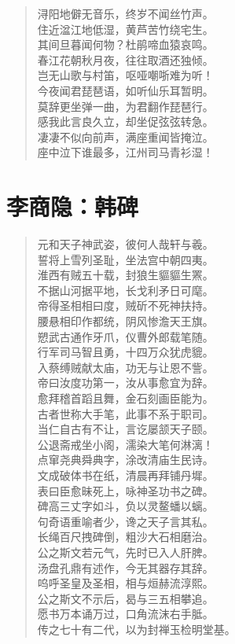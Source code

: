 \documentclass[12pt,oneside]{book}
\newenvironment{shici}{
\begin{verse}
\centering\large\hspace{12pt}}
{\end{verse}}
\begin{document}
\begin{shici}
浔阳地僻无音乐，终岁不闻丝竹声。\\
住近湓江地低湿，黄芦苦竹绕宅生。\\
其间旦暮闻何物？杜鹃啼血猿哀鸣。\\
春江花朝秋月夜，往往取酒还独倾。\\
岂无山歌与村笛，呕哑嘲哳难为听！\\
今夜闻君琵琶语，如听仙乐耳暂明。\\
莫辞更坐弹一曲，为君翻作琵琶行。\\
感我此言良久立，却坐促弦弦转急。\\
凄凄不似向前声，满座重闻皆掩泣。\\
座中泣下谁最多，江州司马青衫湿！
\end{shici}

\chapter{李商隐：韩碑}
\begin{shici}
元和天子神武姿，彼何人哉轩与羲。\\
誓将上雪列圣耻，坐法宫中朝四夷。\\
淮西有贼五十载，封狼生貙貙生罴。\\
不据山河据平地，长戈利矛日可麾。\\
帝得圣相相曰度，贼斫不死神扶持。\\
腰悬相印作都统，阴风惨澹天王旗。\\
愬武古通作牙爪，仪曹外郎载笔随。\\
行军司马智且勇，十四万众犹虎貔。\\
入蔡缚贼献太庙，功无与让恩不訾。\\
帝曰汝度功第一，汝从事愈宜为辞。\\
愈拜稽首蹈且舞，金石刻画臣能为。\\
古者世称大手笔，此事不系于职司。\\
当仁自古有不让，言讫屡颔天子颐。\\
公退斋戒坐小阁，濡染大笔何淋漓！\\
点窜尧典舜典字，涂改清庙生民诗。\\
文成破体书在纸，清晨再拜铺丹墀。\\
表曰臣愈昧死上，咏神圣功书之碑。\\
碑高三丈字如斗，负以灵鳌蟠以螭。\\
句奇语重喻者少，谗之天子言其私。\\
长绳百尺拽碑倒，粗沙大石相磨治。\\
公之斯文若元气，先时已入人肝脾。\\
汤盘孔鼎有述作，今无其器存其辞。\\
呜呼圣皇及圣相，相与烜赫流淳熙。\\
公之斯文不示后，曷与三五相攀追。\\
愿书万本诵万过，口角流沫右手胝。\\
传之七十有二代，以为封禅玉检明堂基。
\end{shici}
\end{document}
